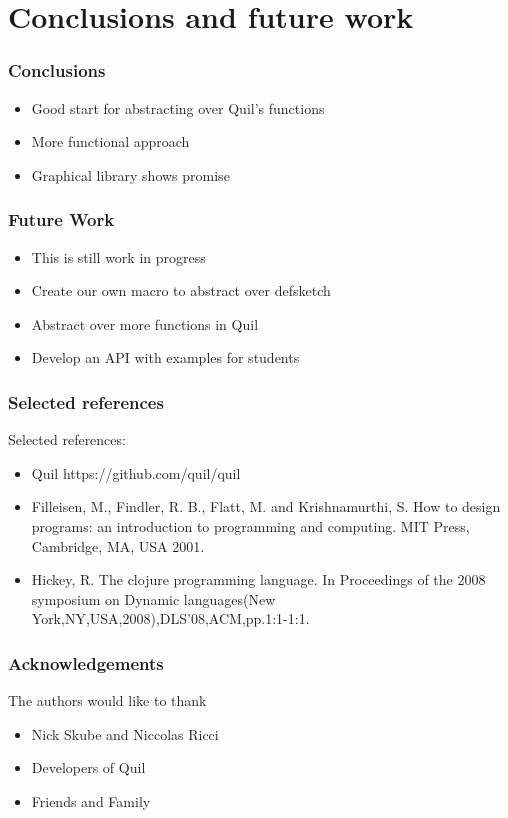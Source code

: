 \documentclass{beamer}
\begin{document}
\section{Conclusions and future work}

\begin{frame}
\frametitle{Conclusions}
\begin{itemize}
\item Good start for abstracting over Quil's functions
\item More functional approach
\item Graphical library shows promise
\end{itemize}
\end{frame}

\begin{frame}
\frametitle{Future Work}
\begin{itemize}
\item This is still work in progress
\item Create our own macro to abstract over defsketch
\item Abstract over more functions in Quil
\item Develop an API with examples for students
\end{itemize}
\end{frame}

\begin{frame}
\frametitle{Selected references}
Selected references:
\begin{itemize}
\item Quil https://github.com/quil/quil
\item Filleisen, M., Findler, R. B., Flatt, M. and Krishnamurthi, S. How to design programs: an introduction to programming and computing. MIT Press, Cambridge, MA, USA 2001.
\item Hickey, R. The clojure programming language. In Proceedings of the 2008 symposium on Dynamic languages(New York,NY,USA,2008),DLS'08,ACM,pp.1:1-1:1.
\end{itemize}
\end{frame}

\begin{frame}
\frametitle{Acknowledgements}
The authors would like to thank
\begin{itemize}
\item Nick Skube and Niccolas Ricci
\item Developers of Quil
\item Friends and Family
\end{itemize}
\end{frame}
\end{document}
